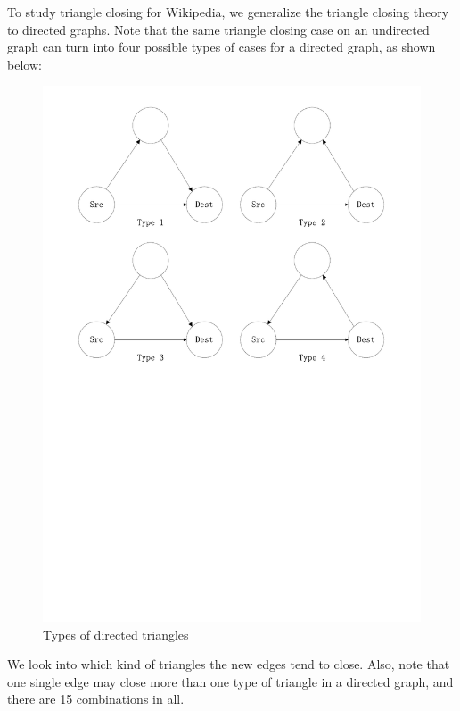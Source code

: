 \documentclass[10pt]{article}
\begin{document}
\begin{multicols}{2}
To study triangle closing for Wikipedia, we generalize the triangle closing theory to directed graphs. Note that the same triangle closing case on an undirected graph can turn into four possible types of cases for a directed graph, as shown below: 
\begin{figure}[H]
    \centering
        \includegraphics[scale = 0.35, trim = 2cm 14cm 2cm 1cm]{./graphs/triangles.pdf}
    \caption{Types of directed triangles} \label{fig:triangles}
\end{figure}
We look into which kind of triangles the new edges tend to close. Also, note that one single edge may close more than one type of triangle in a directed graph, and there are 15 combinations in all. 
\begin{figure}[H]
    \centering

\end{figure}
\end{multicols}
\end{document}
